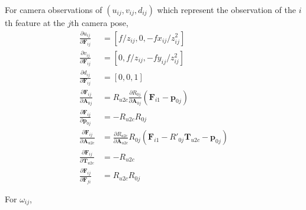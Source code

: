 \documentclass[12pt]{article}   %
\begin{document}
\begin{appendices}
For camera observations of $(u_{ij}, v_{ij}, d_{ij})$ which represent the observation of the $i$th feature at the $j$th camera pose, 
\begin{align}
\frac{\partial u_{ij}}{\partial \textbf{F}_{ij}} &= [f/z_{ij}, 0, -fx_{ij}/z^2_{ij}] \\
\frac{\partial v_{ij}}{\partial \textbf{F}_{ij}} &= [0, f/z_{ij}, -fy_{ij}/z^2_{ij}] \\
\frac{\partial d_{ij}}{\partial \textbf{F}_{ij}} &= [0, 0, 1] \\
\frac{\partial \textbf{F}_{ij}}{\partial \textbf{A}_{0j}} &= R_{u2c} \frac{\partial R_{0j}}{\partial \textbf{A}_{0j}} (\textbf{F}_{i1} - \textbf{p}_{0j}) \\
\frac{\partial \textbf{F}_{ij}}{\partial \textbf{p}_{0j}} &= -R_{u2c} R_{0j} \\
\frac{\partial \textbf{F}_{ij}}{\partial \textbf{A}_{u2c}} &= \frac{\partial R_{u2c}}{\partial \textbf{A}_{u2c}} R_{0j}(\textbf{F}_{i1} - R'_{0j} \textbf{T}_{u2c} - \textbf{p}_{0j}) \\
\frac{\partial \textbf{F}_{ij}}{\partial \textbf{T}_{u2c}} &= -R_{u2c}\\
\frac{\partial \textbf{F}_{ij}}{\partial \textbf{F}_{fi}} &= R_{u2c} R_{0j} 
\end{align}

For $\omega_{ij}$,


\end{appendices}
\end{document}
